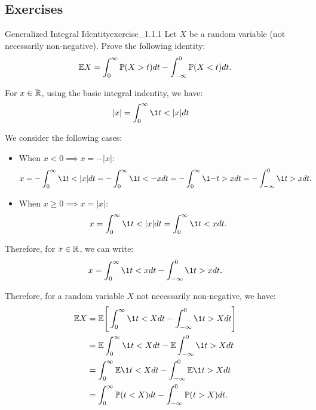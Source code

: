\noindent\subsection*{Exercises}
\begin{exercise}{Generalized Integral Identity}{exercise_1.1.1}
    Let $X$ be a random variable (not necessarily non-negative). Prove the following identity:
    \begin{align}
        \mathbb{E} X = \int_0^\infty \mathbb{P}(X > t)dt - \int_{-\infty}^0 \mathbb{P} (X<t)dt.
    \end{align}
\end{exercise}

\begin{solution*}
    For $x\in\mathbb{R}$, using the basic integral indentity, we have:
    \begin{align*}
        |x| &= \int_0^\infty \1{t < |x|}dt
    \end{align*}
    
    \noindent We consider the following cases:
    \begin{itemize}
        \item When $x < 0 \implies x = -|x|$:
        \begin{align*}
            x &= -\int_0^\infty \1{t < |x|}dt 
                = -\int_0^\infty \1{t < -x}dt = -\int_0^\infty \1{-t>x}dt = -\int_{-\infty}^0 \1{t>x}dt.
        \end{align*}

        \item When $x\ge0 \implies x = |x|$:
        \begin{align*}
            x &= \int_0^\infty \1{t < |x|}dt = \int_0^\infty \1{t<x}dt.
        \end{align*}
    \end{itemize}

    \noindent Therefore, for $x\in\mathbb{R}$, we can write:
    \begin{align*}
        x = \int_0^\infty \1{t<x}dt - \int_{-\infty}^0 \1{t>x}dt.
    \end{align*}

    \noindent Therefore, for a random variable $X$ not necessarily non-negative, we have:
    \begin{align*}
        \E X &= \E\biggSquare{
            \int_0^\infty \1{t<X}dt - \int_{-\infty}^0 \1{t>X}dt
        } \\
        &= \E \int_0^\infty \1{t<X}dt - \E \int_{-\infty}^0 \1{t>X}dt \\
        &= \int_0^\infty \E\1{t<X}dt - \int_{-\infty}^0 \E\1{t>X}dt \\
        &= \int_0^\infty \Pm(t<X)dt - \int_{-\infty}^0 \Pm(t>X)dt.
    \end{align*}
\end{solution*}

